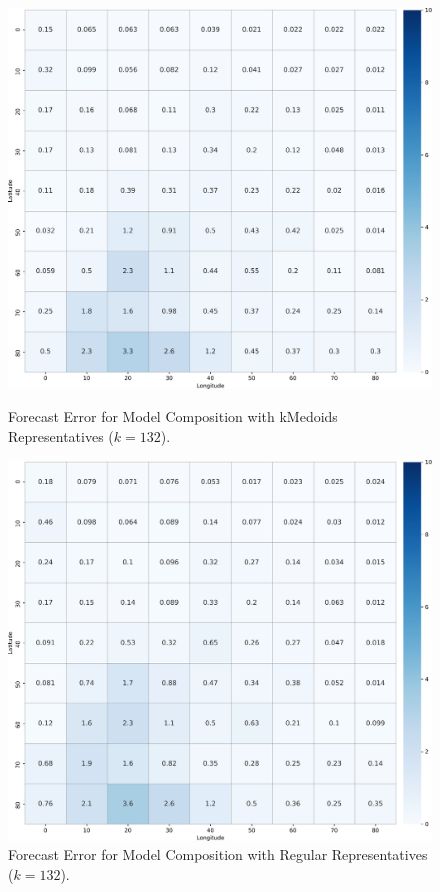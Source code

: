 \begin{figure}[!htbp]
  \centering
  \begin{minipage}[b]{0.45\textwidth}
    \includegraphics[width=\textwidth]{../Figures/query_10x10_kmedoids_k132-1000dpi}
    \caption{Forecast Error for Model Composition with kMedoids Representatives ($k=132$).}
    \label{Fig:kMedoid_10x10_k132}
  \end{minipage}
  \hfill
  \begin{minipage}[b]{0.45\textwidth}
    \includegraphics[width=\textwidth]{../Figures/query_10x10_regular_k132-1000dpi}
    \caption{Forecast Error for Model Composition with Regular Representatives ($k=132$).}
    \label{Fig:Regular_10x10_k132}
  \end{minipage}
\end{figure}

